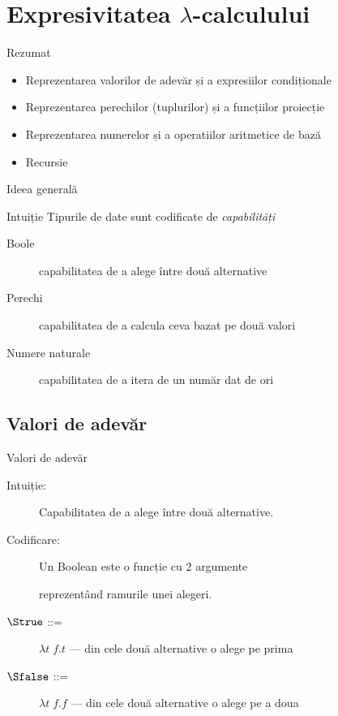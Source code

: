 \documentclass[xcolor=pdftex,romanian,colorlinks]{beamer}
\begin{document}
\section{Expresivitatea $\lambda$-calculului}

\begin{frame}{Rezumat}
  \begin{itemize}
    \item Reprezentarea valorilor de adevăr și a expresiilor condiționale
    \item Reprezentarea perechilor (tuplurilor) și a funcțiilor proiecție
    \item Reprezentarea numerelor și a operatiilor aritmetice de bază
    \item Recursie
  \end{itemize}
\end{frame}

\begin{frame}{Ideea generală}
  \begin{block}{Intuiție}
    Tipurile de date sunt codificate de {\em capabilități}
  \end{block}

  \begin{description}
    \item[Boole] capabilitatea de a alege între două alternative
    \item[Perechi] capabilitatea de a calcula ceva bazat pe două valori
    \item[Numere naturale] capabilitatea de a itera de un număr dat de ori
  \end{description}
\end{frame}

\subsection{Valori de adevăr}

\begin{frame}{Valori de adevăr}

\begin{description}
  \item[Intuiție:] Capabilitatea de a alege între două alternative.
  \item[Codificare:] Un Boolean este o funcție cu 2 argumente
       
        reprezentând ramurile unei alegeri.
  \item[$\Strue$ ::=] $\lambda t\; f. t$
      --- din cele două alternative o alege pe prima
  \item[$\Sfalse$ ::=] $\lambda t\; f. f$
      --- din cele două alternative o alege pe a doua
\end{description}

\end{frame}
\end{document}
